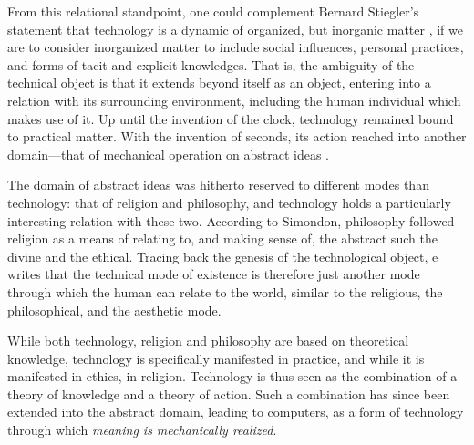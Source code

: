 From this relational standpoint, one could complement Bernard Stiegler's statement that technology is a dynamic of organized, but inorganic matter \citep{stiegler_technics_1998}, if we are to consider inorganized matter to include social influences, personal practices, and forms of tacit and explicit knowledges. That is, the ambiguity of the technical object is that it extends beyond itself as an object, entering into a relation with its surrounding environment, including the human individual which makes use of it. Up until the invention of the clock, technology remained bound to practical matter. With the invention of seconds, its action reached into another domain—that of mechanical operation on abstract ideas \citep{mumford_technics_1934}.

The domain of abstract ideas was hitherto reserved to different modes than technology: that of religion and philosophy, and technology holds a particularly interesting relation with these two. According to Simondon, philosophy followed religion as a means of relating to, and making sense of, the abstract such the divine and the ethical. Tracing back the genesis of the technological object, e writes that the technical mode of existence is therefore just another mode through which the human can relate to the world, similar to the religious, the philosophical, and the aesthetic mode\citep{simondon_mode_1958}.

While both technology, religion and philosophy are based on theoretical knowledge, technology is specifically manifested in practice, and while it is manifested in ethics, in religion. Technology is thus seen as the combination of a theory of knowledge and a theory of action. Such a combination has since been extended into the abstract domain, leading to computers, as a form of technology through which \emph{meaning is mechanically realized}.


